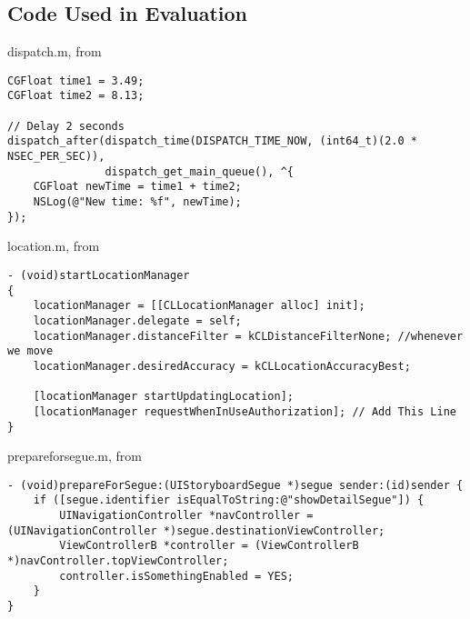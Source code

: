 \documentclass{sfuthesis}
\begin{document}
%
%
%
%
%

\backmatter%
	
	

\begin{appendices}

\chapter{Code Used in Evaluation}\label{chap:evaluationcode}

\begin{listing}
\caption{dispatch.m, from \cite{so4139219}}
\begin{verbatim}
CGFloat time1 = 3.49;
CGFloat time2 = 8.13;

// Delay 2 seconds
dispatch_after(dispatch_time(DISPATCH_TIME_NOW, (int64_t)(2.0 * NSEC_PER_SEC)),
               dispatch_get_main_queue(), ^{
    CGFloat newTime = time1 + time2;
    NSLog(@"New time: %f", newTime);
});
\end{verbatim}
\end{listing}

\begin{listing}
\caption{location.m, from \cite{so24062509}}
\begin{verbatim}
- (void)startLocationManager
{
    locationManager = [[CLLocationManager alloc] init];
    locationManager.delegate = self;
    locationManager.distanceFilter = kCLDistanceFilterNone; //whenever we move
    locationManager.desiredAccuracy = kCLLocationAccuracyBest;

    [locationManager startUpdatingLocation];
    [locationManager requestWhenInUseAuthorization]; // Add This Line
}
\end{verbatim}
\end{listing}

\begin{listing}
\caption{prepareforsegue.m, from \cite{so5210535}}
\begin{verbatim}
- (void)prepareForSegue:(UIStoryboardSegue *)segue sender:(id)sender {
    if ([segue.identifier isEqualToString:@"showDetailSegue"]) {
        UINavigationController *navController = (UINavigationController *)segue.destinationViewController;
        ViewControllerB *controller = (ViewControllerB *)navController.topViewController;
        controller.isSomethingEnabled = YES;
    }
}
\end{verbatim}
\end{listing}


\end{appendices}
\end{document}
